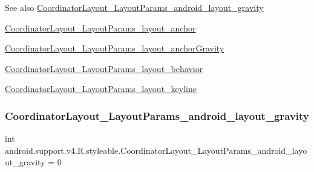 \begin{DoxySeeAlso}{See also}
\hyperlink{classandroid_1_1support_1_1v4_1_1R_1_1styleable_a112dbd54fb1cb541e46c2eee8c3317be}{Coordinator\+Layout\+\_\+\+Layout\+Params\+\_\+android\+\_\+layout\+\_\+gravity} 

\hyperlink{classandroid_1_1support_1_1v4_1_1R_1_1styleable_aa0e6a723ba8e1e1b09bbd5bbcd81a3f2}{Coordinator\+Layout\+\_\+\+Layout\+Params\+\_\+layout\+\_\+anchor} 

\hyperlink{classandroid_1_1support_1_1v4_1_1R_1_1styleable_aebf704b49b05009455d48c43457e5b46}{Coordinator\+Layout\+\_\+\+Layout\+Params\+\_\+layout\+\_\+anchor\+Gravity} 

\hyperlink{classandroid_1_1support_1_1v4_1_1R_1_1styleable_ab7698222e7d3cef07b5dfe63ccec5b53}{Coordinator\+Layout\+\_\+\+Layout\+Params\+\_\+layout\+\_\+behavior} 

\hyperlink{classandroid_1_1support_1_1v4_1_1R_1_1styleable_a13e230146baaab7d1d0d6379b87fbef8}{Coordinator\+Layout\+\_\+\+Layout\+Params\+\_\+layout\+\_\+keyline} 
\end{DoxySeeAlso}
\mbox{\label{classandroid_1_1support_1_1v4_1_1R_1_1styleable_a112dbd54fb1cb541e46c2eee8c3317be}} 
\subsubsection{\texorpdfstring{Coordinator\+Layout\+\_\+\+Layout\+Params\+\_\+android\+\_\+layout\+\_\+gravity}{CoordinatorLayout\_LayoutParams\_android\_layout\_gravity}}
{\footnotesize\ttfamily int android.\+support.\+v4.\+R.\+styleable.\+Coordinator\+Layout\+\_\+\+Layout\+Params\+\_\+android\+\_\+layout\+\_\+gravity = 0\hspace{0.3cm}{\ttfamily [static]}}

